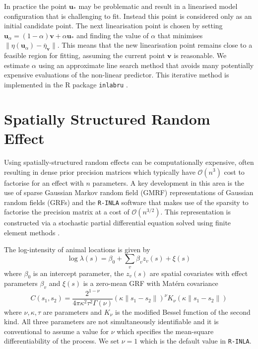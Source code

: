 \documentclass{stylefile16/statsoc}
\newcommand{\bm}{\boldsymbol}  %
\begin{document}
In practice the point $\bm{u}_*$ may be problematic and result in a linearised model configuration that is challenging to fit.  Instead this point is considered only as an initial candidate point.  The next linearisation point is chosen by setting $\bm{u}_{\alpha} = (1 - \alpha)\bm{v} + \alpha \bm{u}_*$ and finding the value of $\alpha$ that minimises $ \lVert \eta(\bm{u}_{\alpha}) - \bar{\eta}_{\bm{v}} \rVert$.  This means that the new linearisation point remains close to a feasible region for fitting, assuming the current point $\bm{v}$ is reasonable.  We estimate $\alpha$ using an approximate line search method that avoids many potentially expensive evaluations of the non-linear predictor.  This iterative method is implemented in the R package \texttt{inlabru} \citep{bachl_inlabru_2019}.

\section{Spatially Structured Random Effect}
\label{sec-gmrf}

Using spatially-structured random effects can be computationally expensive, often resulting in dense prior precision matrices which typically have $\mathcal{O}(n^3)$ cost to factorise for an effect with $n$ parameters.  A key development in this area is the use of sparse Gaussian Markov random field (GMRF) representations of Gaussian random fields (GRFs) and the \texttt{R-INLA} software that makes use of the sparsity to factorise the precision matrix at a cost of $\mathcal{O}(n^{3/2})$.  This representation is constructed via a stochastic partial differential equation solved using finite element methods \citep{lindgren_explicit_2011}.

The log-intensity of animal locations is given by
\begin{equation*}
\log \lambda(s) = \beta_0 + \sum_v \beta_v z_v(s) + \xi(s)
\end{equation*}
where $\beta_0$ is an intercept parameter, the $z_v(s)$ are spatial covariates with effect parameters $\beta_v$ and $\xi(s)$ is a zero-mean GRF with Mat\'ern covariance
\begin{equation}
C(s_1,s_2) = \frac{2^{1-\nu}}{4\pi\kappa^2\tau^2\Gamma(\nu)}(\kappa \|s_1-s_2\|)^{\nu}K_\nu(\kappa \|s_1-s_2\|)
\end{equation}
where \(\nu, \kappa, \tau\) are parameters and \(K_{\nu}\) is the modified Bessel function of the second kind.  All three parameters are not simultaneously identifiable \citep{zhang_inconsistent_2004} and it is conventional to assume a value for $\nu$ which specifies the mean-square differentiability of the process.  We set $\nu = 1$ which is the default value in \texttt{R-INLA}.
\end{document}
